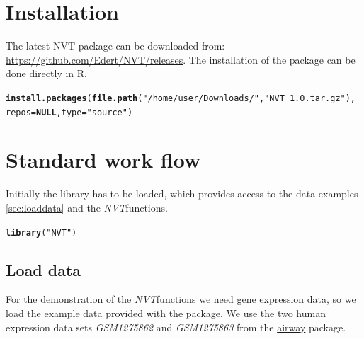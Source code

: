\documentclass[11pt]{article}\usepackage[]{graphicx}\usepackage[usenames,dvipsnames]{color}
\makeatletter
\newcommand{\hlstr}[1]{\textcolor[rgb]{0.192,0.494,0.8}{#1}}%
\newcommand{\hlstd}[1]{\textcolor[rgb]{0.345,0.345,0.345}{#1}}%
\newcommand{\hlkwa}[1]{\textcolor[rgb]{0.161,0.373,0.58}{\textbf{#1}}}%
\newcommand{\hlkwc}[1]{\textcolor[rgb]{0.333,0.667,0.333}{#1}}%
\newcommand{\hlkwd}[1]{\textcolor[rgb]{0.737,0.353,0.396}{\textbf{#1}}}%
\newenvironment{kframe}{%
 \def\at@end@of@kframe{}%
 \ifinner\ifhmode%
  \def\at@end@of@kframe{\end{minipage}}%
  \begin{minipage}{\columnwidth}%
 \fi\fi%
 \def\FrameCommand##1{\hskip\@totalleftmargin \hskip-\fboxsep
 \colorbox{shadecolor}{##1}\hskip-\fboxsep
     \hskip-\linewidth \hskip-\@totalleftmargin \hskip\columnwidth}%
 \MakeFramed {\advance\hsize-\width
   \@totalleftmargin\z@ \linewidth\hsize
   \@setminipage}}%
 {\par\unskip\endMakeFramed%
 \at@end@of@kframe}
\newenvironment{knitrout}{}{} %
\newcommand{\nvt}{\textit{NVT}}
\makeatother
\begin{document}
\tableofcontents

\newpage

\section{Installation}

The latest NVT package can be downloaded from: \url{https://github.com/Edert/NVT/releases}. The installation of the package can be done directly in R.

\begin{knitrout}
\color{fgcolor}\begin{kframe}
\begin{alltt}
\hlkwd{install.packages}\hlstd{(}\hlkwd{file.path}\hlstd{(}\hlstr{"/home/user/Downloads/"}\hlstd{,}\hlstr{"NVT_1.0.tar.gz"}\hlstd{),}
\hlkwc{repos}\hlstd{=}\hlkwa{NULL}\hlstd{,} \hlkwc{type}\hlstd{=}\hlstr{"source"}\hlstd{)}
\end{alltt}
\end{kframe}
\end{knitrout}

\section{Standard work flow}

Initially the library has to be loaded, which provides access to the data examples \ref{sec:loaddata} and the \nvt functions.

\begin{knitrout}
\color{fgcolor}\begin{kframe}
\begin{alltt}
\hlkwd{library}\hlstd{(}\hlstr{"NVT"}\hlstd{)}
\end{alltt}
\end{kframe}
\end{knitrout}

\subsection{Load data}

For the demonstration of the \nvt functions we need gene expression data, so we load the example data provided with the package. We use the two human expression data sets \textit{GSM1275862} and \textit{GSM1275863} from the \href{https://bioconductor.org/packages/release/data/experiment/html/airway.html}{airway}\cite{himes2014} package.
\end{document}
